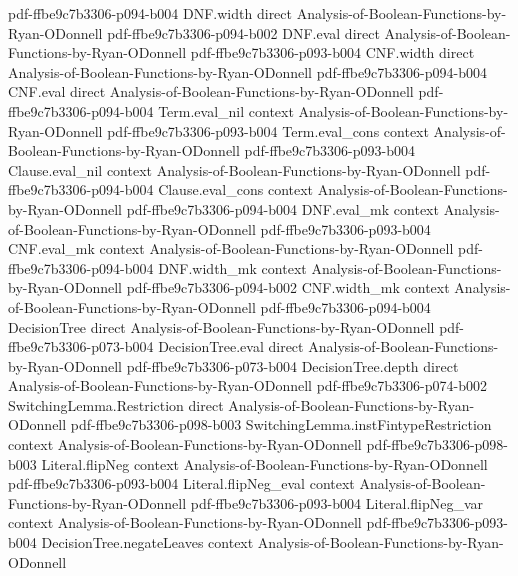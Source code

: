 \begin{lemma}
  {pdf-ffbe9c7b3306-p094-b004}
\proofstep
  {DNF.width}
  {direct}
  {Analysis-of-Boolean-Functions-by-Ryan-ODonnell}
  {pdf-ffbe9c7b3306-p094-b002}
\proofstep
  {DNF.eval}
  {direct}
  {Analysis-of-Boolean-Functions-by-Ryan-ODonnell}
  {pdf-ffbe9c7b3306-p093-b004}
\proofstep
  {CNF.width}
  {direct}
  {Analysis-of-Boolean-Functions-by-Ryan-ODonnell}
  {pdf-ffbe9c7b3306-p094-b004}
\proofstep
  {CNF.eval}
  {direct}
  {Analysis-of-Boolean-Functions-by-Ryan-ODonnell}
  {pdf-ffbe9c7b3306-p094-b004}
\proofstep
  {Term.eval_nil}
  {context}
  {Analysis-of-Boolean-Functions-by-Ryan-ODonnell}
  {pdf-ffbe9c7b3306-p093-b004}
\proofstep
  {Term.eval_cons}
  {context}
  {Analysis-of-Boolean-Functions-by-Ryan-ODonnell}
  {pdf-ffbe9c7b3306-p093-b004}
\proofstep
  {Clause.eval_nil}
  {context}
  {Analysis-of-Boolean-Functions-by-Ryan-ODonnell}
  {pdf-ffbe9c7b3306-p094-b004}
\proofstep
  {Clause.eval_cons}
  {context}
  {Analysis-of-Boolean-Functions-by-Ryan-ODonnell}
  {pdf-ffbe9c7b3306-p094-b004}
\proofstep
  {DNF.eval_mk}
  {context}
  {Analysis-of-Boolean-Functions-by-Ryan-ODonnell}
  {pdf-ffbe9c7b3306-p093-b004}
\proofstep
  {CNF.eval_mk}
  {context}
  {Analysis-of-Boolean-Functions-by-Ryan-ODonnell}
  {pdf-ffbe9c7b3306-p094-b004}
\proofstep
  {DNF.width_mk}
  {context}
  {Analysis-of-Boolean-Functions-by-Ryan-ODonnell}
  {pdf-ffbe9c7b3306-p094-b002}
\proofstep
  {CNF.width_mk}
  {context}
  {Analysis-of-Boolean-Functions-by-Ryan-ODonnell}
  {pdf-ffbe9c7b3306-p094-b004}
\proofstep
  {DecisionTree}
  {direct}
  {Analysis-of-Boolean-Functions-by-Ryan-ODonnell}
  {pdf-ffbe9c7b3306-p073-b004}
\proofstep
  {DecisionTree.eval}
  {direct}
  {Analysis-of-Boolean-Functions-by-Ryan-ODonnell}
  {pdf-ffbe9c7b3306-p073-b004}
\proofstep
  {DecisionTree.depth}
  {direct}
  {Analysis-of-Boolean-Functions-by-Ryan-ODonnell}
  {pdf-ffbe9c7b3306-p074-b002}
\proofstep
  {SwitchingLemma.Restriction}
  {direct}
  {Analysis-of-Boolean-Functions-by-Ryan-ODonnell}
  {pdf-ffbe9c7b3306-p098-b003}
\proofstep
  {SwitchingLemma.instFintypeRestriction}
  {context}
  {Analysis-of-Boolean-Functions-by-Ryan-ODonnell}
  {pdf-ffbe9c7b3306-p098-b003}
\proofstep
  {Literal.flipNeg}
  {context}
  {Analysis-of-Boolean-Functions-by-Ryan-ODonnell}
  {pdf-ffbe9c7b3306-p093-b004}
\proofstep
  {Literal.flipNeg_eval}
  {context}
  {Analysis-of-Boolean-Functions-by-Ryan-ODonnell}
  {pdf-ffbe9c7b3306-p093-b004}
\proofstep
  {Literal.flipNeg_var}
  {context}
  {Analysis-of-Boolean-Functions-by-Ryan-ODonnell}
  {pdf-ffbe9c7b3306-p093-b004}
\proofstep
  {DecisionTree.negateLeaves}
  {context}
  {Analysis-of-Boolean-Functions-by-Ryan-ODonnell}

\end{lemma}
